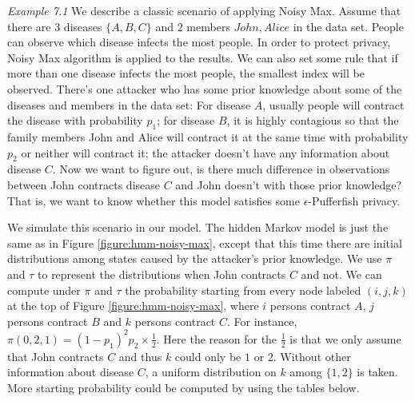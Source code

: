 \noindent
\textit{Example 7.1} We describe a classic scenario of applying Noisy Max. Assume that there
are $3$ diseases $\{A,B,C\}$ and $2$ members ${John, Alice}$ in the data set. People can observe which disease
infects the most people.
In order to protect privacy, Noisy Max algorithm is applied to the results.
We can also set some rule that if more than one disease infects the most people, the smallest index will be observed.
There's one attacker who has some prior knowledge about some of the diseases and members in the data set:
For disease $A$, usually people will contract the disease with probability $p_1$;
for disease $B$, it is highly contagious so that the family members John and Alice will contract
it at the same time with probability $p_2$ or neither will contract it;
the attacker doesn't have any information about disease $C$. Now we want to figure out,
is there much difference in observations between John contracts disease $C$ and John doesn't with those prior knowledge?
That is, we want to know whether this model satisfies some $\epsilon$-Pufferfish privacy.

We simulate this scenario in our model.
The hidden Markov model is just the same as in Figure \ref{figure:hmm-noisy-max}, except that
this time there are initial distributions among states caused by the attacker's prior knowledge.
We use $\pi$ and $\tau$ to represent the distributions when John contracts $C$ and not.
We can compute under $\pi$ and $\tau$ the probability starting from every node labeled $(i,j,k)$ at the top of Figure \ref{figure:hmm-noisy-max},
where $i$ persons contract $A$, $j$ persons contract $B$ and $k$ persons contract $C$.
For instance, $\pi (0,2,1) = (1-p_1)^2 p_2 \times \frac{1}{2}$. Here the reason for the $\frac{1}{2}$
is that we only assume that John contracts $C$ and thus $k$ could only be $1$ or $2$. Without other information
about disease $C$, a uniform
distribution on $k$ among $\{1,2\}$ is taken. More starting probability could be computed by using the
tables below.

